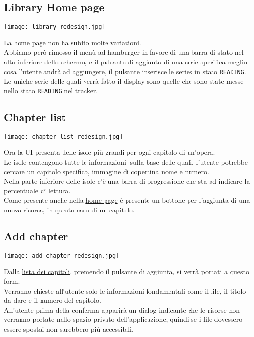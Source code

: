 \documentclass[../Assignment-3-LPSMT.tex]{subfiles}
\begin{document}
\subsection{Library Home page}\label{sec:home_redesign}

\begin{center}
   \texttt{[image: library\_redesign.jpg]}
\end{center}

La home page non ha subito molte variazioni.\\
Abbiamo però rimosso il menù ad hamburger in favore di una barra di stato nel alto inferiore dello schermo, e il pulsante di aggiunta di una serie specifica meglio cosa l'utente andrà ad aggiungere, il pulsante inserisce le series in stato \texttt{READING}.\\
Le uniche serie delle quali verrà fatto il display sono quelle che sono state messe nello stato \texttt{READING} nel tracker.

\subsection{Chapter list}\label{sec:ch_list_redesign}

\begin{center}
   \texttt{[image: chapter\_list\_redesign.jpg]}
\end{center}

Ora la UI presenta delle isole più grandi per ogni capitolo di un'opera.\\
Le isole contengono tutte le informazioni, sulla base delle quali, l'utente potrebbe cercare un capitolo specifico, immagine di copertina nome e numero.\\
Nella parte inferiore delle isole c'è una barra di progressione che sta ad indicare la percentuale di lettura.\\
Come presente anche nella \hyperref[sec:home_redesign]{home page} è presente un bottone per l'aggiunta di una nuova risorsa, in questo caso di un capitolo.

\subsection{Add chapter}

\begin{center}
   \texttt{[image: add\_chapter\_redesign.jpg]}
\end{center}

Dalla \hyperref[sec:ch_list_redesign]{lista dei capitoli}, premendo il pulsante di aggiunta, si verrà portati a questo form.\\
Verranno chieste all'utente solo le informazioni fondamentali come il file, il titolo da dare e il numero del capitolo.\\
All'utente prima della conferma apparirà un dialog indicante che le risorse non verranno portate nello spazio privato dell'applicazione, quindi se i file dovessero essere spostai non sarebbero più accessibili.
\end{document}

